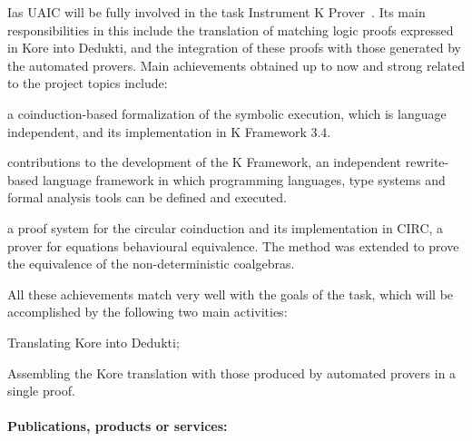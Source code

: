 \begin{sitedescription}{Ias}
UAIC will be fully involved in the task Instrument K Prover~. Its main responsibilities in this 
include the translation of matching logic proofs expressed in Kore into Dedukti, and the integration
of these proofs with those generated by the automated provers. 
Main achievements obtained up to now and strong related to the project topics include:
\begin{compactitem}
\item  a coinduction-based formalization of the symbolic execution, which is language independent, and its implementation in K Framework 3.4.
\item contributions to the development of the K Framework, an independent rewrite-based language framework in which programming languages, type systems and formal analysis tools can be defined and executed.
\item a proof system for the circular coinduction and its implementation in CIRC, a prover for equations behavioural equivalence. The method was extended to prove the equivalence of the non-deterministic coalgebras.
\end{compactitem}
All these achievements match very well with the goals of the task,  which will be  accomplished by the following two main activities:



\begin{compactitem}
\item Translating Kore into Dedukti;
\item Assembling the Kore translation with those produced by automated provers in a single proof.
\end{compactitem}

\paragraph*{Publications, products or services:}



\end{sitedescription}
